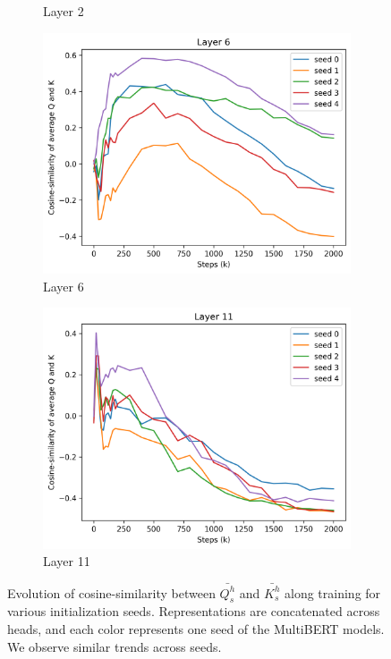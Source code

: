 \begin{appendices}
\begin{figure}[ht]
\begin{subfigure}[b]{0.24\linewidth}
         \caption{Layer 2}
         \label{fig:seeds_l2}
    \end{subfigure}
    \begin{subfigure}[b]{0.24\linewidth}
         \includegraphics[width=\linewidth]{sources/part_1/anisotropy/imgs/seeds_qk_l6.png}
         \caption{Layer 6}
         \label{fig:seeds_l6}
    \end{subfigure}
    \begin{subfigure}[b]{0.24\linewidth}
         \includegraphics[width=\linewidth]{sources/part_1/anisotropy/imgs/seeds_qk_l11.png}
         \caption{Layer 11}
         \label{fig:seeds_l11}
    \end{subfigure}
    \caption{Evolution of cosine-similarity between $\bar{Q^h_s}$ and $\bar{K^h_s}$ along training for various initialization seeds. Representations are concatenated across heads, and each color represents one seed of the MultiBERT models. We observe similar trends across seeds.}
    \label{fig:seeds_qk}
\end{figure}

\end{appendices}

